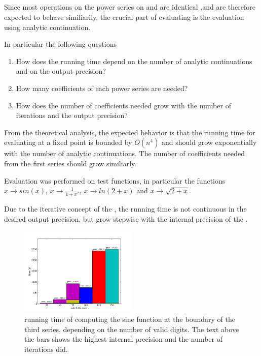 		\subsection{\anarect}
			Since most operations on the power series on \anarect and \baana are identical ‚and are therefore expected to behave similiarily, 
			the crucial part of evaluating \baana is the evaluation using analytic continuation.
			
			In particular the following questions
			\begin{enumerate}
				\item How does the running time depend on the number of analytic continuations and on the output precision?
				\item How many coefficients of each power series are needed?
				\item How does the number of coefficients needed grow with the number of iterations and the output precision?
			\end{enumerate} 

		From the theoretical analysis, the expected behavior is that the running time for evaluating at a fixed 
		point is bounded by $O(n^4)$ and should grow exponentially with the number of analytic continuations.
		The number of coefficients needed from the first series should grow similiarly. 

 		Evaluation was performed on test functions, in particular the functions $x \to sin(x)$, $x \to \frac{1}{1+x^2}$, $x \to ln(2+x)$ and $x \to \sqrt{2+x}$. 

 		Due to the iterative concept of the \irram, the running time is not continuous in the desired output precision, but grow stepwise with the internal precision of the \irram.

		\begin{figure}[h]
			\centering
			\includegraphics[width=0.5\textwidth]{img/analytic/sin_for_series_4_dep_on_n.png}
			\caption{running time of \anarect computing the sine function at the boundary of the third series, depending on the number of valid digits. The text above the bars shows the highest internal precision and the number of iterations \irram did.}
			\label{fig:sin dep on n}
		\end{figure}

